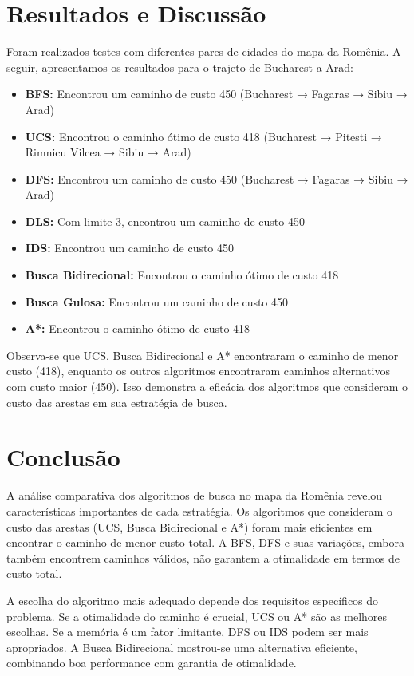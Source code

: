 \documentclass[12pt,a4paper]{article}
\begin{document}
\section{Resultados e Discussão}
Foram realizados testes com diferentes pares de cidades do mapa da Romênia. A seguir, apresentamos os resultados para o trajeto de Bucharest a Arad:

\begin{itemize}
\item \textbf{BFS:} Encontrou um caminho de custo 450 (Bucharest → Fagaras → Sibiu → Arad)
\item \textbf{UCS:} Encontrou o caminho ótimo de custo 418 (Bucharest → Pitesti → Rimnicu Vilcea → Sibiu → Arad)
\item \textbf{DFS:} Encontrou um caminho de custo 450 (Bucharest → Fagaras → Sibiu → Arad)
\item \textbf{DLS:} Com limite 3, encontrou um caminho de custo 450
\item \textbf{IDS:} Encontrou um caminho de custo 450
\item \textbf{Busca Bidirecional:} Encontrou o caminho ótimo de custo 418
\item \textbf{Busca Gulosa:} Encontrou um caminho de custo 450
\item \textbf{A*:} Encontrou o caminho ótimo de custo 418
\end{itemize}

Observa-se que UCS, Busca Bidirecional e A* encontraram o caminho de menor custo (418), enquanto os outros algoritmos encontraram caminhos alternativos com custo maior (450). Isso demonstra a eficácia dos algoritmos que consideram o custo das arestas em sua estratégia de busca.

\section{Conclusão}
A análise comparativa dos algoritmos de busca no mapa da Romênia revelou características importantes de cada estratégia. Os algoritmos que consideram o custo das arestas (UCS, Busca Bidirecional e A*) foram mais eficientes em encontrar o caminho de menor custo total. A BFS, DFS e suas variações, embora também encontrem caminhos válidos, não garantem a otimalidade em termos de custo total.

A escolha do algoritmo mais adequado depende dos requisitos específicos do problema. Se a otimalidade do caminho é crucial, UCS ou A* são as melhores escolhas. Se a memória é um fator limitante, DFS ou IDS podem ser mais apropriados. A Busca Bidirecional mostrou-se uma alternativa eficiente, combinando boa performance com garantia de otimalidade.
\end{document}
